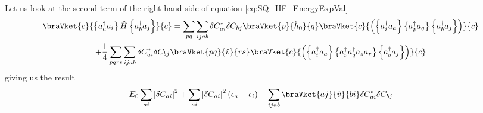 	Let us look at the second term of the right hand side of equation \ref{eq:SQ_HF_EnergyExpVal}
	\begin{multline*}
		\braVket{c}{\left\{ a_{a}^{\dagger}a_{i}\right\} \hat{H}\left\{ a_{b}^{\dagger}a_{j}\right\} }{c}  =  \sum_{pq}\sum_{ijab}\delta C_{ai}^{*}\delta C_{bj}\braVket{p}{\hat{h}_{0}}{q}\braVket{c}{\left(\left\{ a_{i}^{\dagger}a_{a}\right\} \left\{ a_{p}^{\dagger}a_{q}\right\} \left\{ a_{b}^{\dagger}a_{j}\right\} \right)}{c}\\
		  +  \frac{1}{4}\sum_{pqrs}\sum_{ijab}\delta C_{ai}^{*}\delta C_{bj}\braVket{pq}{\hat{v}}{rs}\braVket{c}{\left(\left\{ a_{i}^{\dagger}a_{a}\right\} \left\{ a_{p}^{\dagger}a_{q}^{\dagger}a_{s}a_{r}\right\} \left\{ a_{b}^{\dagger}a_{j}\right\} \right)}{c}
	\end{multline*}
	giving us the result
	\[
	E_{0}\sum_{ai}\left|\delta C_{ai}\right|^{2}+\sum_{ai}\left|\delta C_{ai}\right|^{2}\left(\epsilon_{a}-\epsilon_{i}\right)-\sum_{ijab}\braVket{aj}{\hat{v}}{bi}\delta C_{ai}^{*}\delta C_{bj}
	\]

